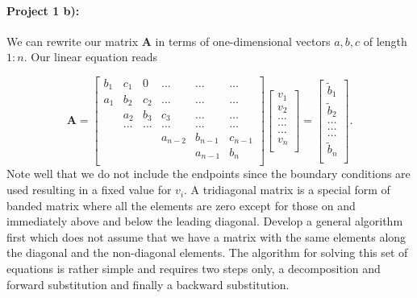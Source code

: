 \documentclass[%
oneside,                 %
final,                   %
10pt]{article}
\begin{document}
\paragraph{Project 1 b):}
We can rewrite our matrix $\mathbf{A}$ in terms of one-dimensional vectors $a,b,c$  
of length $1:n$. 
Our linear equation reads

\[
    \mathbf{A} = \begin{bmatrix}
                           b_1& c_1 & 0 &\dots   & \dots &\dots \\
                           a_1 & b_2 & c_2 &\dots &\dots &\dots \\
                           & a_2 & b_3 & c_3 & \dots & \dots \\
                           & \dots   & \dots &\dots   &\dots & \dots \\
                           &   &  &a_{n-2}  &b_{n-1}& c_{n-1} \\
                           &    &  &   &a_{n-1} & b_n \\
                      \end{bmatrix}\begin{bmatrix}
                           v_1\\
                           v_2\\
                           \dots \\
                          \dots  \\
                          \dots \\
                           v_n\\
                      \end{bmatrix}
  =\begin{bmatrix}
                           \tilde{b}_1\\
                           \tilde{b}_2\\
                           \dots \\
                           \dots \\
                          \dots \\
                           \tilde{b}_n\\
                      \end{bmatrix}.
\]
Note well that we do not include the endpoints since the boundary conditions are used resulting in a fixed value for $v_i$.
A tridiagonal matrix is a special form of banded matrix where all the elements are zero except for 
those on and immediately above and below the leading diagonal.
Develop a general algorithm first which does not assume that we have a matrix with the same elements along the diagonal and the non-diagonal elements.
The algorithm for solving this set of equations is rather simple and requires two steps only, a decomposition 
and forward substitution and finally a backward substitution. 
\end{document}

